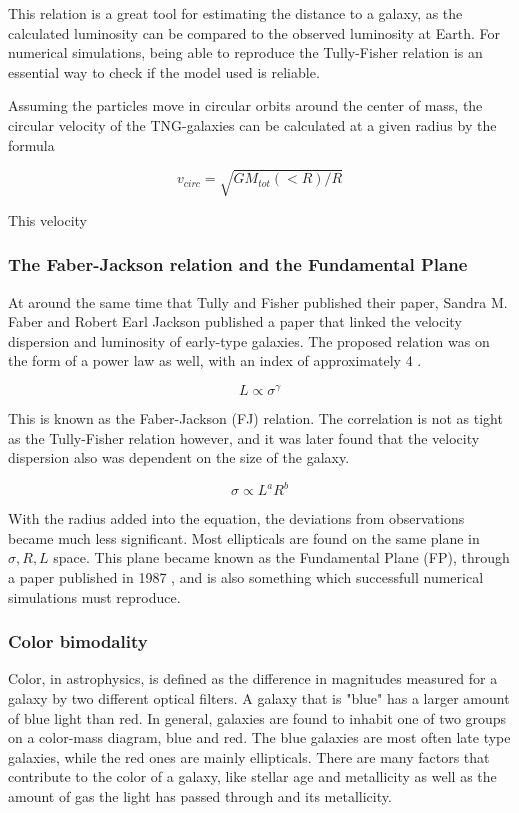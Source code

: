 This relation is a great tool for estimating the distance to a galaxy, as the calculated luminosity can be compared to the observed luminosity at Earth. For numerical simulations, being able to reproduce the Tully-Fisher relation is an essential way to check if the model used is reliable.

Assuming the particles move in circular orbits around the center of mass, the circular velocity of the TNG-galaxies can be calculated at a given radius by the formula

\begin{equation}
    v_{circ} = \sqrt{GM_{tot}(<R)/R} 
\end{equation}

This velocity

\subsubsection{The Faber-Jackson relation and the Fundamental Plane}
At around the same time that Tully and Fisher published their paper, Sandra M. Faber and Robert Earl Jackson published a paper that linked the velocity dispersion and luminosity of early-type galaxies. The proposed relation was on the form of a power law as well, with an index of approximately 4 \parencite{FaberJackson1976}.

\begin{equation}
    L \propto \sigma^{\gamma} 
\end{equation}

This is known as the Faber-Jackson (FJ) relation. The correlation is not as tight as the Tully-Fisher relation however, and it was later found that the velocity dispersion also was dependent on the size of the galaxy.

\begin{equation}
    \sigma \propto L^a R^b
\end{equation}

With the radius added into the equation, the deviations from observations became much less significant. Most ellipticals are found on the same plane in ${\sigma, R, L}$ space. This plane became known as the Fundamental Plane (FP), through a paper published in 1987 \parencite{Djorgovski1987}, and is also something which successfull numerical simulations must reproduce.

\subsubsection{Color bimodality}
Color, in astrophysics, is defined as the difference in magnitudes measured for a galaxy by two different optical filters. A galaxy that is "blue" has a larger amount of blue light than red. In general, galaxies are found to inhabit one of two groups on a color-mass diagram, blue and red. The blue galaxies are most often late type galaxies, while the red ones are mainly ellipticals. There are many factors that contribute to the color of a galaxy, like stellar age and metallicity as well as the amount of gas the light has passed through and its metallicity.

